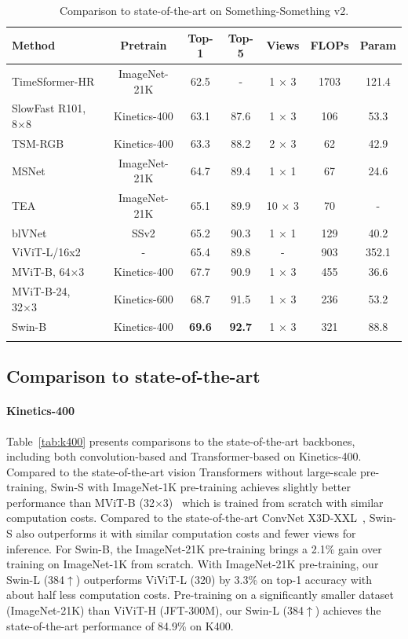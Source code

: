\documentclass{article}
\newcommand{\demph}[1]{\textcolor[rgb]{0.565,0.565,0.565}{#1}}
\begin{document}
\begin{table}[t]
\caption{Comparison to state-of-the-art on Something-Something v2.}
\centering
  \begin{tabular}{l|c|cc|c|cc}
  \Xhline{1.0pt}
  Method & Pretrain & Top-1 & Top-5 & Views & FLOPs & Param  \\
  \hline
  TimeSformer-HR~\cite{timesformer2021} & ImageNet-21K & 62.5 & - & 1 × 3 & 1703 & 121.4 \\
  SlowFast R101, 8×8~\cite{feichtenhofer2019slowfast} & Kinetics-400 & 63.1 & 87.6 & 1 × 3 & 106 & 53.3 \\
  TSM-RGB~\cite{lin2019tsm} & Kinetics-400 & 63.3 & 88.2 & 2 × 3 & 62 & 42.9\\
  MSNet~\cite{kwon2020motionsqueeze}	& ImageNet-21K & 64.7 & 89.4 & 1 × 1 & 67&24.6 \\
  TEA~\cite{li2020tea} & ImageNet-21K & 65.1 & 89.9 & 10 × 3 & 70& -\\
  blVNet~\cite{fan2019more} & SSv2 & 65.2 & 90.3 & 1 × 1 & 129 & 40.2\\
  ViViT-L/16x2~\cite{arnab2021vivit} & - & 65.4 & 89.8 & - & 903 & 352.1\\
  MViT-B, 64×3~\cite{fan2021multiscale} & Kinetics-400 & 67.7 & 90.9 & 1 × 3 & 455 & 36.6 \\
  \demph{MViT-B-24, 32×3~\cite{fan2021multiscale}} & \demph{Kinetics-600} & \demph{68.7} & \demph{91.5} & \demph{1 × 3} & \demph{236} & \demph{53.2}\\
  \hline
  Swin-B & Kinetics-400 & \textbf{69.6} & \textbf{92.7} & 1 × 3 & 321 & 88.8 \\
  \Xhline{1.0pt}
  \end{tabular}
\label{tab:ssv2}
\end{table}


\subsection{Comparison to state-of-the-art}
\paragraph{Kinetics-400} Table~\ref{tab:k400} presents comparisons to the state-of-the-art backbones, including both convolution-based and Transformer-based on Kinetics-400.
Compared to the state-of-the-art vision Transformers without large-scale pre-training, Swin-S with ImageNet-1K pre-training achieves slightly better performance than MViT-B (32$\times$3)~\cite{mvit2021} which is trained from scratch with similar computation costs. Compared to the state-of-the-art ConvNet X3D-XXL~\cite{feichtenhofer2020x3d}, Swin-S also outperforms it with similar computation costs and fewer views for inference.
For Swin-B, the ImageNet-21K pre-training brings a 2.1\% gain over training on ImageNet-1K from scratch. 
With ImageNet-21K pre-training, our Swin-L (384$\uparrow$) outperforms ViViT-L (320) by 3.3\% on top-1 accuracy with about half less computation costs.
Pre-training on a significantly smaller dataset (ImageNet-21K) than ViViT-H (JFT-300M), our Swin-L (384$\uparrow$) achieves the state-of-the-art performance of 84.9\% on K400.
\end{document}
